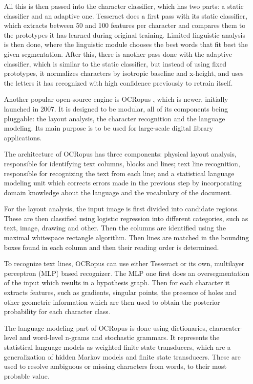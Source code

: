 All this is then passed into the character classifier, which has two parts: a static classifier and an adaptive one. Tesseract does a first pass with its static classifier, which extracts between 50 and 100 features per character and compares them to the prototypes it has learned during original training. Limited linguistic analysis is then done, where the linguistic module chooses the best words that fit best the given segmentation. After this, there is another pass done with the adaptive classifier, which is similar to the static classifier, but instead of using fixed prototypes, it normalizes characters by isotropic baseline and x-height, and uses the letters it has recognized with high confidence previously to retrain itself. 

Another popular open-source engine is OCRopus \cite{breuel2008ocropus}, which is newer, initially launched in 2007. It is designed to be modular, all of its components being pluggable: the layout analysis, the character recognition and the language modeling. Its main purpose is to be used for large-scale digital library applications.

The architecture of OCRopus has three components: physical layout analysis, responsible for identifying text columns, blocks and lines; text line recognition, responsible for recognizing the text from each line; and a statistical language modeling unit which corrects errors made in the previous step by incorporating domain knowledge about the language and the vocabulary of the document. 

For the layout analysis, the input image is first divided into candidate regions. These are then classified using logistic regression into different categories, such as text, image, drawing and other. Then the columns are identified using the maximal whitespace rectangle algorithm. Then lines are matched in the bounding boxes found in each column and then their reading order is determined. 

To recognize text lines, OCRopus can use either Tesseract or its own, multilayer perceptron (MLP) based recognizer. The MLP one first does an oversegmentation of the input which results in a hypothesis graph. Then for each character it extracts features, such as gradients, singular points, the presence of holes and other geometric information which are then used to obtain the posterior probability for each character class. 

The language modeling part of OCRopus is done using dictionaries, characater-level and word-level n-grams and stochastic grammars. It represents the statistical language models as weighted finite state transducers, which are a generalization of hidden Markov models and finite state transducers. These are used to resolve ambiguous or missing characters from words, to their most probable value. 

